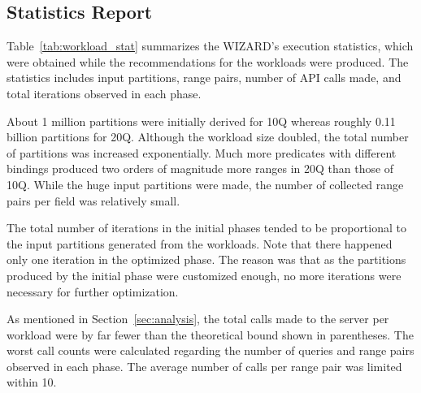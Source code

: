 \documentclass[runningheads]{comsis2}
\begin{document}
\subsection{Statistics Report}
\label{sec:stat}

Table~\ref{tab:workload_stat} summarizes the WIZARD's execution statistics, 
which were obtained while the recommendations for the \hbox{workloads} were produced. 
The statistics includes input partitions, 
range pairs, number of API calls made, and total iterations 
observed in each phase. 

About 1 million partitions were initially derived for 10Q whereas roughly 0.11 billion partitions for 20Q. 
Although the workload size doubled, the total number of partitions was increased exponentially. 
Much more predicates with different bindings produced two orders of magnitude more ranges in 20Q than those of 10Q. 
While the huge input partitions were made, the number of collected range pairs per field was relatively small. 

The total number of iterations in the initial phases 
tended to be proportional to the input \hbox{partitions} 
\hbox{generated} from the workloads. 
Note that there \hbox{happened} only one iteration in the optimized phase. 
The reason was that as the partitions produced by the \hbox{initial} phase were customized enough, 
no more \hbox{iterations} were \hbox{necessary} for further optimization. 

As mentioned in Section~\ref{sec:analysis}, the total calls made to 
the server per workload were by far fewer than the theoretical bound shown in parentheses. 
The worst call counts were calculated regarding the number of queries and range pairs observed in each phase. 
The average number of calls per range pair was limited within 10. %
\end{document}
